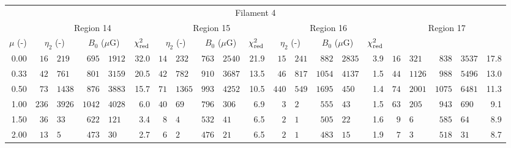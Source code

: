 \begin{tabular}{@{}r r@{ $\pm$ }lr@{ $\pm$ }lr
                     r@{ $\pm$ }lr@{ $\pm$ }lr
                     r@{ $\pm$ }lr@{ $\pm$ }lr
                     r@{ $\pm$ }lr@{ $\pm$ }lr@{}}

\toprule
\multicolumn{21}{c}{Filament 4} \\
\cmidrule{1-21}
{} & \multicolumn{5}{c}{Region 14}
   & \multicolumn{5}{c}{Region 15}
   & \multicolumn{5}{c}{Region 16}
   & \multicolumn{5}{c}{Region 17} \\
\cmidrule(lr){2-6} \cmidrule(lr){7-11} \cmidrule(lr){12-16} \cmidrule(l){17-21}
$\mu$ (-) & \multicolumn{2}{c}{$\eta_2$ (-)}
          & \multicolumn{2}{c}{$B_0$ ($\mu$G)} & $\chi^2_{\mathrm{red}}$
          & \multicolumn{2}{c}{$\eta_2$ (-)}
          & \multicolumn{2}{c}{$B_0$ ($\mu$G)} & $\chi^2_{\mathrm{red}}$
          & \multicolumn{2}{c}{$\eta_2$ (-)}
          & \multicolumn{2}{c}{$B_0$ ($\mu$G)} & $\chi^2_{\mathrm{red}}$ \\
\cmidrule{1-21}
0.00 & $16$ & $219$ & $695$ & $1912$ & 32.0
     & $14$ & $232$ & $763$ & $2540$ & 21.9
     & $15$ & $241$ & $882$ & $2835$ & 3.9
     & $16$ & $321$ & $838$ & $3537$ & 17.8 \\
0.33 & $42$ & $761$ & $801$ & $3159$ & 20.5
     & $42$ & $782$ & $910$ & $3687$ & 13.5
     & $46$ & $817$ & $1054$ & $4137$ & 1.5
     & $44$ & $1126$ & $988$ & $5496$ & 13.0 \\
0.50 & $73$ & $1438$ & $876$ & $3883$ & 15.7
     & $71$ & $1365$ & $993$ & $4252$ & 10.5
     & $440$ & $549$ & $1695$ & $450$ & 1.4
     & $74$ & $2001$ & $1075$ & $6481$ & 11.3 \\
1.00 & $236$ & $3926$ & $1042$ & $4028$ & 6.0
     & $40$ & $69$ & $796$ & $306$ & 6.9
     & $3$ & $2$ & $555$ & $43$ & 1.5
     & $63$ & $205$ & $943$ & $690$ & 9.1 \\
1.50 & $36$ & $33$ & $622$ & $121$ & 3.4
     & $8$ & $4$ & $532$ & $41$ & 6.5
     & $2$ & $1$ & $505$ & $22$ & 1.6
     & $9$ & $6$ & $585$ & $64$ & 8.9 \\
2.00 & $13$ & $5$ & $473$ & $30$ & 2.7
     & $6$ & $2$ & $476$ & $21$ & 6.5
     & $2$ & $1$ & $483$ & $15$ & 1.9
     & $7$ & $3$ & $518$ & $31$ & 8.7 \\


\end{tabular}
